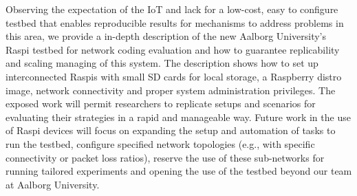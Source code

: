 \label{sec:conclusions}
Observing the expectation of the \ac{IoT} and lack for a low-cost, easy to configure testbed that enables reproducible results for mechanisms to address problems in this area, we provide a in-depth description of the new Aalborg University's \ac{Raspi} testbed for network coding evaluation and how to guarantee replicability and scaling managing of this system. The description shows how to set up interconnected \ac{Raspi}s with small SD cards for local storage, a Raspberry distro image, network connectivity and proper system administration privileges. The exposed work will permit researchers to replicate setups and scenarios for evaluating their strategies in a rapid and manageable way. Future work in the use of \ac{Raspi} devices will focus on expanding the setup and automation of tasks to run the testbed, configure specified network topologies (e.g., with specific connectivity or packet loss ratios), reserve the use of these sub-networks for running tailored experiments and opening the use of the testbed beyond our team at Aalborg University.
